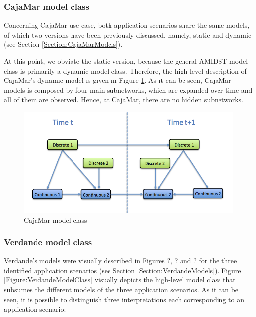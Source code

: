 \subsubsection{CajaMar model class}

Concerning CajaMar use-case, both application scenarios share the same models, of which two versions have been previously discussed, namely, static and dynamic (see Section \ref{Section:CajaMarModels}). 

At this point, we obviate the static version, because the general AMIDST model class is primarily a dynamic model class. Therefore, the high-level description of CajaMar's dynamic model is given in Figure \ref{Figure:CajaMarModelClass}. As it can be seen, CajaMar models is composed by four main subnetworks, which are expanded over time and all of them are observed. Hence, at CajaMar, there are no hidden subnetworks. 

\begin{figure}[ht!]
\begin{center}
\includegraphics[scale=0.4]{./figures/CajaMarModelClass}
\caption{\label{Figure:CajaMarModelClass} CajaMar model class}
\end{center}
\end{figure}

\subsubsection{Verdande model class}

Verdande's models were visually described in Figures ?, ? and ? for the three identified application scenarios (see Section \ref{Section:VerdandeModels}). Figure \ref{Figure:VerdandeModelClass} visually depicts the high-level model class that subsumes the different models of the three application scenarios. As it can be seen, it is possible to distinguish three interpretations each corresponding to an application scenario:

